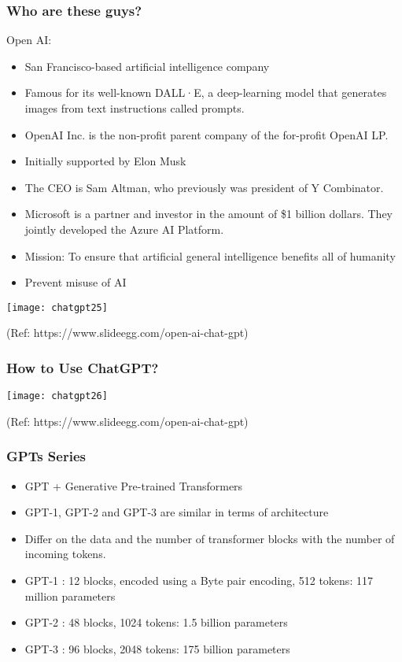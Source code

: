 \begin{frame}[fragile]\frametitle{Who are these guys?}

Open AI:
\begin{itemize}
\item San Francisco-based artificial intelligence company
\item Famous for its well-known DALL·E, a deep-learning model that generates images from text instructions called prompts.
\item OpenAI Inc. is the non-profit parent company of the for-profit OpenAI LP.
\item Initially supported by Elon Musk
\item The CEO is Sam Altman, who previously was president of Y Combinator.
\item Microsoft is a partner and investor in the amount of \$1 billion dollars. They jointly developed the Azure AI Platform.
\item Mission: To ensure that artificial general intelligence benefits all of humanity
\item Prevent misuse of AI
\end{itemize}	 

\begin{center}
\texttt{[image: chatgpt25]}
\end{center}				
{\tiny (Ref: https://www.slideegg.com/open-ai-chat-gpt)}


\end{frame}

\begin{frame}[fragile]\frametitle{How to Use ChatGPT?}


\begin{center}
\texttt{[image: chatgpt26]}
\end{center}				
{\tiny (Ref: https://www.slideegg.com/open-ai-chat-gpt)}


\end{frame}


\begin{frame}[fragile]\frametitle{GPTs Series}


\begin{itemize}
\item GPT + Generative Pre-trained Transformers
\item GPT-1, GPT-2 and GPT-3 are similar in terms of architecture 
\item Differ on the data and the number of transformer blocks with the number of incoming tokens.   
\item GPT-1 : 12 blocks, encoded using a Byte pair encoding, 512 tokens: 117 million parameters 
\item GPT-2 : 48 blocks, 1024 tokens: 1.5 billion parameters 
\item GPT-3 : 96 blocks, 2048 tokens: 175 billion parameters 
\end{itemize}	 

\end{frame}

